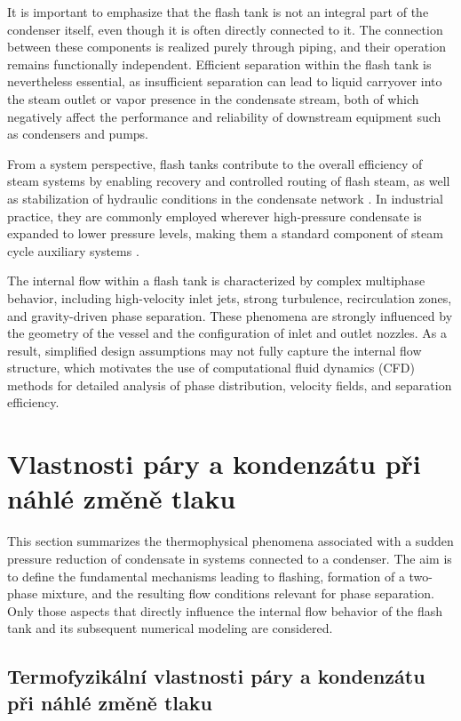 It is important to emphasize that the flash tank is not an integral part of the condenser itself, even though it is often directly connected to it. The connection between these components is realized purely through piping, and their operation remains functionally independent. Efficient separation within the flash tank is nevertheless essential, as insufficient separation can lead to liquid carryover into the steam outlet or vapor presence in the condensate stream, both of which negatively affect the performance and reliability of downstream equipment such as condensers and pumps.

From a system perspective, flash tanks contribute to the overall efficiency of steam systems by enabling recovery and controlled routing of flash steam, as well as stabilization of hydraulic conditions in the condensate network \cite{salimi_technical-economic_2023}. In industrial practice, they are commonly employed wherever high-pressure condensate is expanded to lower pressure levels, making them a standard component of steam cycle auxiliary systems \cite{goodarzvand-chegini_energy_2023}.

The internal flow within a flash tank is characterized by complex multiphase behavior, including high-velocity inlet jets, strong turbulence, recirculation zones, and gravity-driven phase separation. These phenomena are strongly influenced by the geometry of the vessel and the configuration of inlet and outlet nozzles. As a result, simplified design assumptions may not fully capture the internal flow structure, which motivates the use of computational fluid dynamics (CFD) methods for detailed analysis of phase distribution, velocity fields, and separation efficiency.


\section{Vlastnosti páry a kondenzátu při náhlé změně tlaku}
This section summarizes the thermophysical phenomena associated with a sudden pressure reduction of condensate in systems connected to a condenser. The aim is to define the fundamental mechanisms leading to flashing, formation of a two-phase mixture, and the resulting flow conditions relevant for phase separation. Only those aspects that directly influence the internal flow behavior of the flash tank and its subsequent numerical modeling are considered.

\subsection{Termofyzikální vlastnosti páry a kondenzátu při náhlé změně tlaku}

